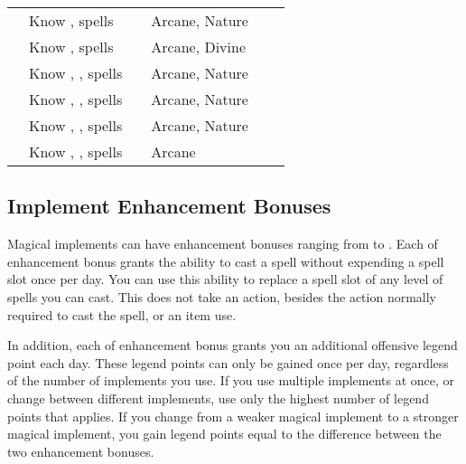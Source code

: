 \begin{longtabuwrapper}
\begin{longtabu}{l X l l l l}
                 & Know ,  spells &  & Arcane, Nature &  \\
                 & Know ,  spells &  & Arcane, Divine &  \\
                 & Know , ,  spells &  & Arcane, Nature &  \\
                 & Know , ,  spells &  & Arcane, Nature &  \\
                 & Know , ,  spells &  & Arcane, Nature &  \\
                 & Know , ,  spells &  & Arcane &  \\
            \end{longtabu}
        \end{longtabuwrapper}
        \twocolumn

    \subsection{Implement Enhancement Bonuses}\label{Implement Enhancement Bonuses}

        Magical implements can have enhancement bonuses ranging from  to .
        Each  of enhancement bonus grants the ability to cast a spell without expending a spell slot once per day.
        You can use this ability to replace a spell slot of any level of spells you can cast.
        This does not take an action, besides the action normally required to cast the spell, or an item use.

        In addition, each  of enhancement bonus grants you an additional offensive legend point each day.
        These legend points can only be gained once per day, regardless of the number of implements you use.
        If you use multiple implements at once, or change between different implements, use only the highest number of legend points that applies.
        If you change from a weaker magical implement to a stronger magical implement, you gain legend points equal to the difference between the two enhancement bonuses.

